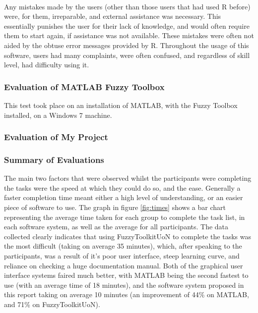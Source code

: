 \ \\
Any mistakes made by the users (other than those users that had used R before) were, for them, irreparable, and external assistance was necessary. This essentially punishes the user for their lack of knowledge, and would often require them to start again, if assistance was not available. These mistakes were often not aided by the obtuse error messages provided by R. Throughout the usage of this software, users had many complaints, were often confused, and regardless of skill level, had difficulty using it.
\newpage 

\subsubsection{Evaluation of MATLAB Fuzzy Toolbox} 	
This test took place on an installation of MATLAB, with the Fuzzy Toolbox installed, on a Windows 7 machine. 


\subsubsection{Evaluation of My Project}	

\subsubsection{Summary of Evaluations}	
The main two factors that were observed whilst the participants were completing the tasks were the speed at which they could do so, and the ease. Generally a faster completion time meant either a high level of understanding, or an easier piece of software to use. The graph in figure \ref{fig:times} shows a bar chart representing the average time taken for each group to complete the task list, in each software system, as well as the average for all participants. The data collected clearly indicates that using FuzzyToolkitUoN to complete the tasks was the most difficult (taking on average  35 minutes), which, after speaking to the participants, was a result of it's poor user interface, steep learning curve, and reliance on checking a huge documentation manual. Both of the graphical user interface systems faired much better, with MATLAB being the second fastest to use (with an average time of 18 minutes), and the software system proposed in this report taking on average 10 minutes (an improvement of 44\% on MATLAB, and 71\% on FuzzyToolkitUoN). 
			
